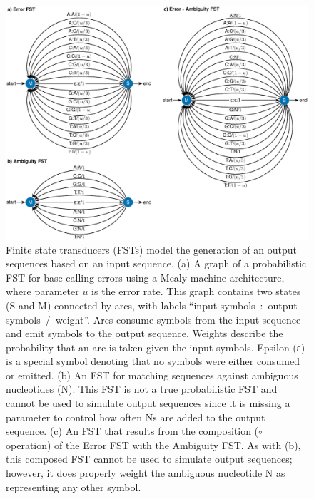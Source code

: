 \documentclass[12pt,letterpaper]{article}
\begin{document}
\begin{figure}[!ht]
    \centering
    \includegraphics[width=\textwidth]{figures/fig-fst-base-calling-new.pdf}
    \caption[FSTs more the generation of sequences]{%
    Finite state transducers (FSTs) model the generation of an output sequences based on an input sequence.
    (a) A graph of a probabilistic FST \citep{cotterell-etal-2014-stochastic} for base-calling errors using a Mealy-machine architecture, where parameter $u$ is the error rate. This graph contains two states (S and M) connected by arcs, with labels ``input symbols~:~output symbols~/~weight''. Arcs consume symbols from the input sequence and emit symbols to the output sequence. Weights describe the probability that an arc is taken given the input symbols. Epsilon (ε) is a special symbol denoting that no symbols were either consumed or emitted.
    (b) An FST for matching sequences against ambiguous nucleotides (N). This FST is not a true probabilistic FST and cannot be used to simulate output sequences since it is missing a parameter to control how often Ns are added to the output sequence.
    (c) An FST that results from the composition ($∘$ operation) of the Error FST with the Ambiguity FST. As with (b), this composed FST cannot be used to simulate output sequences; however, it does properly weight the ambiguous nucleotide N as representing any other symbol.
    }\label{fig:base-calling}
\end{figure}
\end{document}
